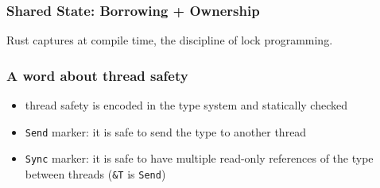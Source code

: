 \documentclass{beamer}
\begin{document}
\begin{frame}
    \frametitle{Shared State: Borrowing + Ownership}
    Rust captures at compile time, the discipline of lock programming.
\end{frame}

\begin{frame}
    \frametitle{A word about thread safety}
    \begin{itemize}
        \item thread safety is encoded in the type system and statically checked
        \item \texttt{Send} marker: it is safe to send the type to another thread
        \item \texttt{Sync} marker: it is safe to have multiple read-only references of the type between threads (\texttt{\&T} is \texttt{Send})
    \end{itemize}
\end{frame}
\end{document}
